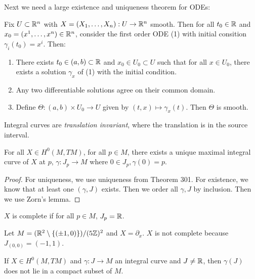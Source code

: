 \documentclass[twoside, 10pt]{article}
\begin{document}
    Next we need a large existence and uniqueness theorem for ODEs:
    \begin{thm}
        Fix $U \subset \mathbb{R}^n$ with $X = (X_1, \ldots, X_n):U \to \mathbb{R}^n$ smooth. Then for all $t_0 \in \mathbb{R}$ and $x_0 = (x^1, \ldots, x^n) \in \mathbb{R}^n$, consider the first order ODE (1) with initial consition $\gamma_i(t_0) = x^i$. Then:
        \begin{enumerate}
            \item There exists $t_0 \in (a,b) \subset \mathbb{R}$ and $x_0 \in U_0 \subset U$ such that for all $x \in U_0$, there exists a solution $\gamma_x$ of (1) with the initial condition.
            \item Any two differentiable solutions agree on their common domain.
            \item Define $\Theta: (a,b) \times U_0 \to U$ given by $(t,x) \mapsto \gamma_x(t)$. Then $\Theta$ is smooth.
        \end{enumerate}
    \end{thm}
    
    \begin{rmk}
        Integral curves are \textit{translation invariant}, where the translation is in the source interval.
    \end{rmk}

    \begin{lem}
        For all $X \in H^0(M, TM)$, for all $p \in M$, there exists a unique maximal integral curve of $X$ at $p$, $\gamma: J_p \to M$ where $0 \in J_p, \gamma(0) = p$.
    \end{lem}

    \begin{proof}
        For uniqueness, we use uniqueness from Theorem 301. For existence, we know that at least one $(\gamma, J)$ exists. Then we order all $\gamma, J$ by inclusion. Then we use Zorn's lemma.
    \end{proof}

    \begin{defn}
        $X$ is complete if for all $p \in M$, $J_p = \mathbb{R}$.
    \end{defn}

    \begin{exm}
        Let $M = ( \mathbb{R}^2 \setminus \{(\pm 1, 0) \} ) / (5\mathbb{Z})^2$ and $X = \partial_x$. $X$ is not complete because $J_{(0,0)} = (-1,1)$.
    \end{exm}

    \begin{lem}
        If $X \in H^0(M, TM)$ and $\gamma:J \to M$ an integral curve and $J \neq \mathbb{R}$, then $\gamma(J)$ does not lie in a compact subset of $M$.
    \end{lem}
\end{document}
